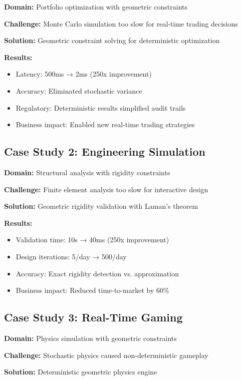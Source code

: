 \documentclass{article}
\begin{document}
\textbf{Domain:} Portfolio optimization with geometric constraints

\textbf{Challenge:} Monte Carlo simulation too slow for real-time trading decisions

\textbf{Solution:} Geometric constraint solving for deterministic optimization

\textbf{Results:}
\begin{itemize}
    \item Latency: 500ms → 2ms (250x improvement)
    \item Accuracy: Eliminated stochastic variance
    \item Regulatory: Deterministic results simplified audit trails
    \item Business impact: Enabled new real-time trading strategies
\end{itemize}

\subsection{Case Study 2: Engineering Simulation}

\textbf{Domain:} Structural analysis with rigidity constraints

\textbf{Challenge:} Finite element analysis too slow for interactive design

\textbf{Solution:} Geometric rigidity validation with Laman's theorem

\textbf{Results:}
\begin{itemize}
    \item Validation time: 10s → 40ms (250x improvement)
    \item Design iterations: 5/day → 500/day
    \item Accuracy: Exact rigidity detection vs. approximation
    \item Business impact: Reduced time-to-market by 60\%
\end{itemize}

\subsection{Case Study 3: Real-Time Gaming}

\textbf{Domain:} Physics simulation with geometric constraints

\textbf{Challenge:} Stochastic physics caused non-deterministic gameplay

\textbf{Solution:} Deterministic geometric physics engine
\end{document}
